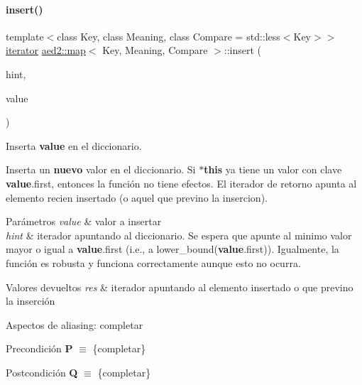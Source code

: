\paragraph{\texorpdfstring{insert()}{insert()}\hspace{0.1cm}{\footnotesize\ttfamily [1/2]}}
{\footnotesize\ttfamily template$<$class Key, class Meaning, class Compare = std\+::less$<$\+Key$>$$>$ \\
\hyperlink{classaed2_1_1map_1_1iterator}{iterator} \hyperlink{classaed2_1_1map}{aed2\+::map}$<$ Key, Meaning, Compare $>$\+::insert (\begin{DoxyParamCaption}\item[{\hyperlink{classaed2_1_1map_1_1const__iterator}{const\+\_\+iterator}}]{hint,  }\item[{const \hyperlink{classaed2_1_1map_a719db98e0ff9a837610f76be33264680_a719db98e0ff9a837610f76be33264680}{value\+\_\+type} \&}]{value }\end{DoxyParamCaption})\hspace{0.3cm}{\ttfamily [inline]}}



Inserta {\bfseries value} en el diccionario. 

Inserta un {\bfseries nuevo} valor en el diccionario. Si {\bfseries $\ast$this} ya tiene un valor con clave {\bfseries value}.first, entonces la función no tiene efectos. El iterador de retorno apunta al elemento recien insertado (o aquel que previno la insercion).


\begin{DoxyParams}{Parámetros}
{\em value} & valor a insertar \\
\hline
{\em hint} & iterador apuntando al diccionario. Se espera que apunte al minimo valor mayor o igual a {\bfseries value}.first (i.\+e., a lower\+\_\+bound({\bfseries value}.first)). Igualmente, la función es robusta y funciona correctamente aunque esto no ocurra. \\
\hline
\end{DoxyParams}

\begin{DoxyRetVals}{Valores devueltos}
{\em res} & iterador apuntando al elemento insertado o que previno la inserción\\
\hline
\end{DoxyRetVals}
\begin{DoxyParagraph}{Aspectos de aliasing\+:}
completar
\end{DoxyParagraph}
\begin{DoxyPrecond}{Precondición}
{\bfseries P} $\equiv$ \{completar\} 
\end{DoxyPrecond}
\begin{DoxyPostcond}{Postcondición}
{\bfseries Q} $\equiv$ \{completar\}
\end{DoxyPostcond}

